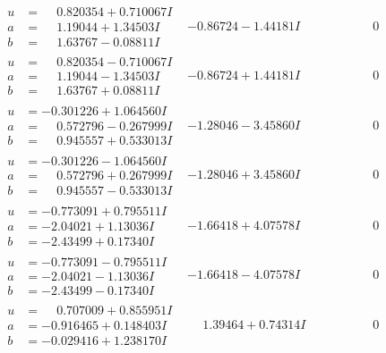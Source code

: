 \documentclass[1p]{elsarticle_modified}
\theoremstyle{definition}
\begin{document}
$$\begin{array}{c|c|c}
\begin{aligned}
u &= \phantom{-}0.820354 + 0.710067 I \\
a &= \phantom{-}1.19044 + 1.34503 I \\
b &= \phantom{-}1.63767 - 0.08811 I\end{aligned}
 & -0.86724 - 1.44181 I & \phantom{-0.000000 } 0 \\ \hline\begin{aligned}
u &= \phantom{-}0.820354 - 0.710067 I \\
a &= \phantom{-}1.19044 - 1.34503 I \\
b &= \phantom{-}1.63767 + 0.08811 I\end{aligned}
 & -0.86724 + 1.44181 I & \phantom{-0.000000 } 0 \\ \hline\begin{aligned}
u &= -0.301226 + 1.064560 I \\
a &= \phantom{-}0.572796 - 0.267999 I \\
b &= \phantom{-}0.945557 + 0.533013 I\end{aligned}
 & -1.28046 - 3.45860 I & \phantom{-0.000000 } 0 \\ \hline\begin{aligned}
u &= -0.301226 - 1.064560 I \\
a &= \phantom{-}0.572796 + 0.267999 I \\
b &= \phantom{-}0.945557 - 0.533013 I\end{aligned}
 & -1.28046 + 3.45860 I & \phantom{-0.000000 } 0 \\ \hline\begin{aligned}
u &= -0.773091 + 0.795511 I \\
a &= -2.04021 + 1.13036 I \\
b &= -2.43499 + 0.17340 I\end{aligned}
 & -1.66418 + 4.07578 I & \phantom{-0.000000 } 0 \\ \hline\begin{aligned}
u &= -0.773091 - 0.795511 I \\
a &= -2.04021 - 1.13036 I \\
b &= -2.43499 - 0.17340 I\end{aligned}
 & -1.66418 - 4.07578 I & \phantom{-0.000000 } 0 \\ \hline\begin{aligned}
u &= \phantom{-}0.707009 + 0.855951 I \\
a &= -0.916465 + 0.148403 I \\
b &= -0.029416 + 1.238170 I\end{aligned}
 & \phantom{-}1.39464 + 0.74314 I & \phantom{-0.000000 } 0 \\ \hline\begin{aligned}

\end{aligned}
\end{array}$$
\end{document}
